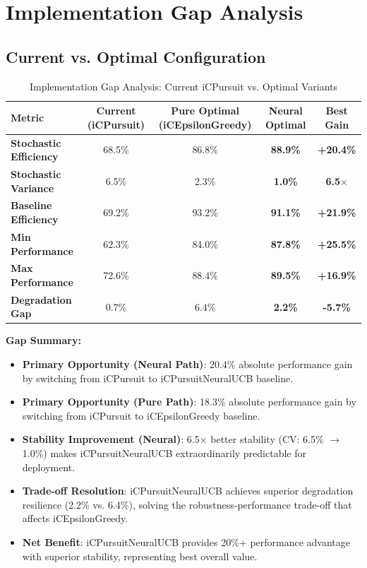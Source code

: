\documentclass[12pt,a4paper]{article}
\newcommand{\primarytext}[1]{\textcolor{primaryblue}{\textbf{#1}}}
\newcommand{\success}[1]{\textcolor{accentgreen}{\textbf{#1}}}
\newcommand{\warning}[1]{\textcolor{warningred}{\textbf{#1}}}
\newcommand{\neural}[1]{\textcolor{neuralcolor}{\textbf{#1}}}
\begin{document}
\section{Implementation Gap Analysis}

\subsection{Current vs. Optimal Configuration}

\begin{table}[H]
\small
\centering
\caption{Implementation Gap Analysis: Current iCPursuit vs. Optimal Variants}
\label{tab:implementation-gap}
\begin{tabular}{@{}lcccc@{}}
\toprule
\textbf{Metric} & \textbf{Current (iCPursuit)} & \textbf{Pure Optimal (iCEpsilonGreedy)} & \textbf{Neural Optimal} & \textbf{Best Gain} \\
\midrule
\warning{Stochastic Efficiency} & 68.5\% & 86.8\% & \neural{88.9\%} & \neural{+20.4\%} \\
\warning{Stochastic Variance} & 6.5\% & 2.3\% & \neural{1.0\%} & \neural{6.5$\times$} \\
\warning{Baseline Efficiency} & 69.2\% & 93.2\% & \neural{91.1\%} & \neural{+21.9\%} \\
\warning{Min Performance} & 62.3\% & 84.0\% & \neural{87.8\%} & \neural{+25.5\%} \\
\warning{Max Performance} & 72.6\% & 88.4\% & \neural{89.5\%} & \neural{+16.9\%} \\
\midrule
\warning{Degradation Gap} & 0.7\% & 6.4\% & \neural{2.2\%} & \neural{-5.7\%} \\
\bottomrule
\end{tabular}
\end{table}

\textbf{Gap Summary:}
\begin{itemize}
\item \neural{Primary Opportunity (Neural Path)}: 20.4\% absolute performance gain by switching from iCPursuit to iCPursuitNeuralUCB baseline.
\item \primarytext{Primary Opportunity (Pure Path)}: 18.3\% absolute performance gain by switching from iCPursuit to iCEpsilonGreedy baseline.
\item \neural{Stability Improvement (Neural)}: 6.5$\times$ better stability (CV: 6.5\% $\rightarrow$ 1.0\%) makes iCPursuitNeuralUCB extraordinarily predictable for deployment.
\item \warning{Trade-off Resolution}: iCPursuitNeuralUCB achieves superior degradation resilience (2.2\% vs. 6.4\%), solving the robustness-performance trade-off that affects iCEpsilonGreedy.
\item \success{Net Benefit}: iCPursuitNeuralUCB provides 20\%+ performance advantage with superior stability, representing best overall value.
\end{itemize}
\end{document}
